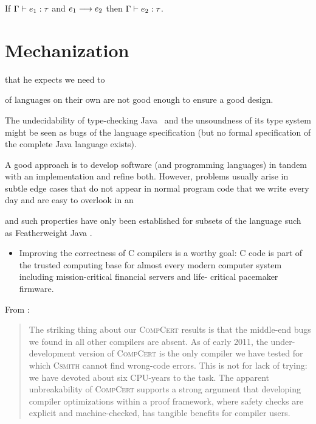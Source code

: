 {\begin{lem}[Preservation]
  If ${\Gamma} \vdash {e_1} : {\tau}$ and ${e_1} \longrightarrow {e_2}$ then ${\Gamma} \vdash {e_2} : {\tau}$.
\end{lem}




\section{Mechanization}

that he expects we need to

of languages on their own are not good enough to ensure a
good design.




The undecidability of type-checking Java~\cite{grigore2017} and the unsoundness
of its type system \cite{amin2016java} might be seen as bugs of the language
specification (but no formal specification of the complete Java language
exists).


A good approach is to develop software (and programming languages) in tandem
with an implementation and refine both. However, problems usually arise in
subtle edge cases that do not appear in normal program code that we write every
day and are easy to overlook in an





and such properties have only been established for subsets of the language such
as Featherweight Java \cite{igarashi2001featherweight}.

\begin{itemize}
\item
  Improving the correctness of C compilers is a worthy goal: C code is part of
  the trusted computing base for almost every modern computer system including
  mission-critical financial servers and life- critical pacemaker firmware.
\end{itemize}
From \cite{yang2011bugs}:

\blockquote{ The striking thing about our \textsc{CompCert} results is that the
  middle-end bugs we found in all other compilers are absent. As of early 2011,
  the under-development version of \textsc{CompCert} is the only compiler we
  have tested for which \textsc{Csmith} cannot find wrong-code errors. This is
  not for lack of trying: we have devoted about six CPU-years to the task. The
  apparent unbreakability of \textsc{CompCert} supports a strong argument that
  developing compiler optimizations within a proof framework, where safety
  checks are explicit and machine-checked, has tangible benefits for compiler
  users.}


}
